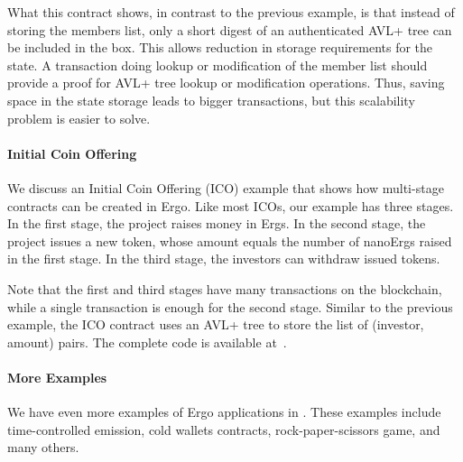  What this contract shows, in contrast to the previous example, is that instead of storing the members list, only a short digest of an authenticated AVL+ tree can be included in the box. This allows reduction in storage requirements for the state. A transaction doing lookup or modification of the member list should provide a proof for AVL+ tree lookup or modification operations. Thus, saving space in the state storage leads to bigger transactions, but this scalability problem is easier to solve.

\paragraph{Initial Coin Offering}

 We discuss an Initial Coin Offering (ICO) example that shows how multi-stage contracts can be created in Ergo. Like most ICOs, our example has three stages. In the first stage, the project raises money in Ergs. In the second stage, the project issues a new token, whose amount equals the number of nanoErgs raised in the first stage. In the third stage, the investors can withdraw issued tokens.

 Note that the first and third stages have many transactions on
 the blockchain, while a single transaction is enough for the second stage. Similar to the previous example, the ICO contract uses an AVL+ tree to store the list of (investor, amount) pairs. The complete code is available at~\cite{icoTutorial}.


\paragraph{More Examples}

 We have even more examples of Ergo applications in \cite{ergoTutorial, ergoAdvTutorial}. These examples include time-controlled emission, cold wallets contracts, rock-paper-scissors game, and many others.